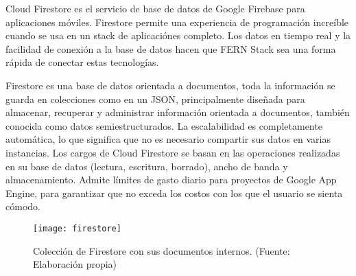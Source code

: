 Cloud Firestore es el servicio de base de datos de Google Firebase para aplicaciones móviles. Firestore permite una experiencia de programación increíble cuando se usa en un stack de aplicaciónes completo. Los datos en tiempo real y la facilidad de conexión a la base de datos hacen que FERN Stack sea una forma rápida de conectar estas tecnologías.
\vspace{0.8cm}

Firestore es una base de datos orientada a documentos, toda la información se guarda en colecciones como en un JSON, principalmente diseñada para almacenar, recuperar y administrar información orientada a documentos, también conocida como datos semiestructurados. La \gls{escalabilidad} es completamente automática, lo que significa que no es necesario compartir sus datos en varias instancias. Los cargos de Cloud Firestore se basan en las operaciones realizadas en su base de datos (lectura, escritura, borrado), ancho de banda y almacenamiento. Admite límites de gasto diario para proyectos de Google App Engine, para garantizar que no exceda los costos con los que el usuario se sienta cómodo.
\vspace{0.8cm}

\begin{figure}[H]
  \centering
  \texttt{[image: firestore]}
  \caption{Colección de Firestore con sus documentos internos. (Fuente: Elaboración propia)}
\end{figure}